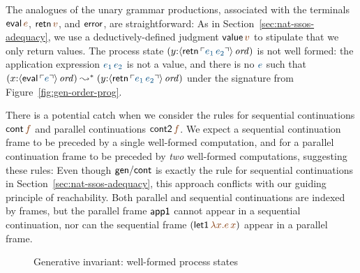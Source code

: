 The analogues of the unary grammar productions, associated with the
terminals ${\sf eval}\,\lf{e}$, ${\sf retn}\,\lf{v}$, and ${\sf
  error}$, are straightforward:
%
\smallskip
{}
\smallskip 
%
As in Section~\ref{sec:nat-ssos-adequacy}, we use a
deductively-defined judgment ${\sf value}\,\lf{v}$ to stipulate that
we only return values. The process state $(y{:}\istrue{\susp{{\sf
      retn}\,\interp{e_1\,e_2}}})$ is not well formed: the
application expression $\obj{e_1\,e_2}$ is not a value, and
there is no $\obj{e}$ such that $(x{:}\istrue{\susp{{\sf
      eval}\,\interp{e}}}) \leadsto^* (y{:}\istrue{\susp{{\sf
      retn}\,\interp{e_1\,e_2}}})$ under the signature from
Figure~\ref{fig:gen-order-prog}.

There is a potential catch when we consider the rules for sequential
continuations ${\sf cont}\,\lf{f}$ and parallel continuations ${\sf
  cont2}\,\lf{f}$. We expect a sequential continuation frame to be
preceded by a single well-formed computation, and for a parallel
continuation frame to be preceded by {\it two} well-formed
computations, suggesting these rules:
%
\smallskip
{}
\smallskip 
%
Even though ${\sf gen/cont}$ is exactly the rule for sequential
continuations in Section~\ref{sec:nat-ssos-adequacy}, this approach
conflicts with our guiding principle of reachability.
Both parallel and sequential continuations are indexed by
frames, but the parallel frame ${\sf app1}$ cannot appear in a
sequential continuation, nor can the sequential frame $({\sf
  let1}\,\lf{\lambda x.e\,x})$ appear in a parallel frame. 

\begin{figure}[tp]
\caption{Generative invariant: well-formed process states}
\label{fig:gen-order} 
\end{figure}

\newcommand{\siggenorder}{\Sigma_{\it Gen\ref{fig:gen-order}}}
\newcommand{\siggenordertp}{\Sigma_{\it Gen\ref{fig:gen-ordertp}}}
\newcommand{\siggenstate}{\Sigma_{\it Gen\ref{fig:gen-state}}}
\newcommand{\siggendests}{\Sigma_{\it Gen\ref{fig:gen-destinations}}}
\newcommand{\siggenletcc}{\Sigma_{\it Gen\ref{fig:gen-letcc2}}}

